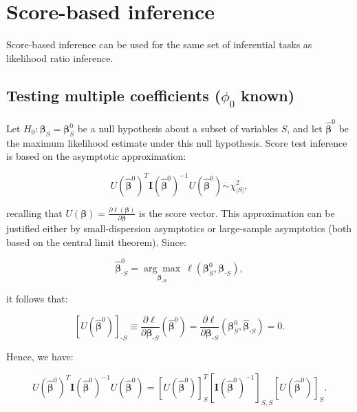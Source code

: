 \documentclass[
  11pt,
  letterpaper,
  oneside]{book}
\theoremstyle{definition}
\theoremstyle{plain}
\theoremstyle{plain}
\theoremstyle{plain}
\theoremstyle{remark}
\begin{document}
\hypertarget{sec-score-inference}{%
\section{Score-based inference}\label{sec-score-inference}}

Score-based inference can be used for the same set of inferential tasks
as likelihood ratio inference.

\hypertarget{sec-score-test-multiple-coeff}{%
\subsection{\texorpdfstring{Testing multiple coefficients (\(\phi_0\)
known)}{Testing multiple coefficients (\textbackslash phi\_0 known)}}\label{sec-score-test-multiple-coeff}}

Let \(H_0: \boldsymbol{\beta}_S = \boldsymbol{\beta}_S^0\) be a null
hypothesis about a subset of variables \(S\), and let
\(\boldsymbol{\widehat{\beta}}^0\) be the maximum likelihood estimate
under this null hypothesis. Score test inference is based on the
asymptotic approximation:

\[
U(\boldsymbol{\widehat{\beta}}^0)^T \boldsymbol{I}(\boldsymbol{\widehat{\beta}}^0)^{-1} U(\boldsymbol{\widehat{\beta}}^0) \overset{\cdot}{\sim} \chi^2_{|S|},
\]

recalling that
\(U(\boldsymbol{\beta}) = \frac{\partial \ell(\boldsymbol{\beta})}{\partial \boldsymbol{\beta}}\)
is the score vector. This approximation can be justified either by
small-dispersion asymptotics or large-sample asymptotics (both based on
the central limit theorem). Since:

\[
\boldsymbol{\widehat{\beta}}^0_{\text{-}S} = \underset{\boldsymbol{\beta}_{\text{-}S}}{\arg \max}\ \ell(\boldsymbol{\beta}^0_{S}, \boldsymbol{\beta}_{\text{-}S}),
\]

it follows that:

\[
[U(\boldsymbol{\widehat{\beta}}^0)]_{\text{-}S} \equiv \frac{\partial \ell}{\partial \boldsymbol{\beta}_{\text{-}S}}(\boldsymbol{\widehat{\beta}}^0) = \frac{\partial \ell}{\partial \boldsymbol{\beta}_{\text{-}S}}(\boldsymbol{\beta}^0_{S}, \boldsymbol{\widehat{\beta}}_{\text{-}S}) = 0.
\]

Hence, we have:

\[
U(\boldsymbol{\widehat{\beta}}^0)^T \boldsymbol{I}(\boldsymbol{\widehat{\beta}}^0)^{-1} U(\boldsymbol{\widehat{\beta}}^0) = [U(\boldsymbol{\widehat{\beta}}^0)]_S^T [\boldsymbol{I}(\boldsymbol{\widehat{\beta}}^0)^{-1}]_{S,S} [U(\boldsymbol{\widehat{\beta}}^0)]_S.
\]
\end{document}
